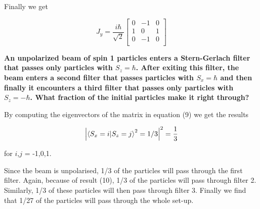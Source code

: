 \begin{alphaparts}
Finally we get

\begin{equation}
    J_y = 
    \frac{i \hbar}{\sqrt{2}}
    \begin{bmatrix}
    0 & -1 & 0 \\
    1 & 0 & 1 \\
    0 & -1 & 0 \\
    \end{bmatrix}
\end{equation}

\questionpart 
\textbf{An unpolarized beam of spin 1 particles enters a Stern-Gerlach filter
that passes only particles with $S_z = \hbar$. After exiting this filter, the beam 
enters a second filter that passes particles with $S_x = \hbar$ and then finally it 
encounters a third filter that passes only particles with $S_z = -\hbar$.  
What fraction of the initial particles make it right through?}

By computing the eigenvectors of the matrix in equation (9) we get the results

\begin{equation}
    \abs{\braket{S_x = i}{S_z = j}^2 = 1/3}^2 = \frac{1}{3}
\end{equation}

for $i$,$j$ = -1,0,1.

Since the beam is unpolarised, 1/3 of the particles will pass through the first filter. Again, because of result (10), 1/3 of the particles will pass through filter 2. Similarly, 1/3 of these particles will then pass through filter 3. Finally we find that 1/27 of the particles will pass through the whole set-up. 



\end{alphaparts}
